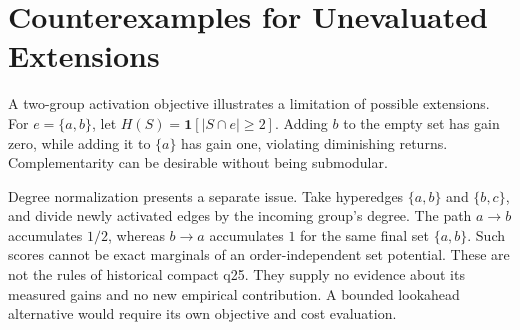 \documentclass[11pt,a4paper]{article}
\begin{document}
\section{Counterexamples for Unevaluated Extensions}
A two-group activation objective illustrates a limitation of possible
extensions. For $e=\{a,b\}$, let $H(S)=\mathbf{1}[|S\cap e|\geq2]$.
Adding $b$ to the empty set has gain zero, while adding it to $\{a\}$ has gain
one, violating diminishing returns. Complementarity can be desirable without
being submodular.

Degree normalization presents a separate issue. Take hyperedges
$\{a,b\}$ and $\{b,c\}$, and divide newly activated edges by the incoming
group's degree. The path $a\rightarrow b$ accumulates $1/2$, whereas
$b\rightarrow a$ accumulates $1$ for the same final set $\{a,b\}$.
Such scores cannot be exact marginals of an order-independent set potential.
These are not the rules of historical compact q25. They supply no evidence
about its measured gains and no new empirical contribution. A bounded
lookahead alternative would require its own objective and cost evaluation.


\end{document}
